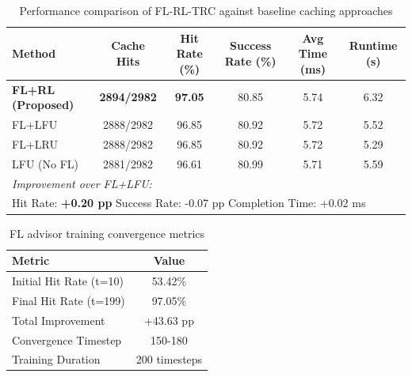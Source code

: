 \begin{table}[t]
\centering
\caption{Performance comparison of FL-RL-TRC against baseline caching approaches}
\label{table:performance_results}
\begin{tabular}{l|c|c|c|c|c}
\hline
\rowcolor[gray]{0.9}
\textbf{Method} & \textbf{Cache Hits} & \textbf{Hit Rate (\%)} & \textbf{Success Rate (\%)} & \textbf{Avg Time (ms)} & \textbf{Runtime (s)} \\
\hline
\textbf{FL+RL (Proposed)} & \textbf{2894/2982} & \textbf{97.05} & 80.85 & 5.74 & 6.32 \\
\hline
FL+LFU & 2888/2982 & 96.85 & 80.92 & 5.72 & 5.52 \\
FL+LRU & 2888/2982 & 96.85 & 80.92 & 5.72 & 5.29 \\
LFU (No FL) & 2881/2982 & 96.61 & 80.99 & 5.71 & 5.59 \\
\hline
\multicolumn{6}{l}{\textit{Improvement over FL+LFU:}} \\
\multicolumn{6}{l}{Hit Rate: \textbf{+0.20 pp} \quad Success Rate: -0.07 pp \quad Completion Time: +0.02 ms} \\
\hline
\end{tabular}
\end{table}

\begin{table}[t]
\centering
\caption{FL advisor training convergence metrics}
\label{table:fl_convergence}
\begin{tabular}{l|c}
\hline
\rowcolor[gray]{0.9}
\textbf{Metric} & \textbf{Value} \\
\hline
Initial Hit Rate (t=10) & 53.42\% \\
Final Hit Rate (t=199) & 97.05\% \\
Total Improvement & +43.63 pp \\
Convergence Timestep & 150-180 \\
Training Duration & 200 timesteps \\
\hline
\end{tabular}
\end{table}

